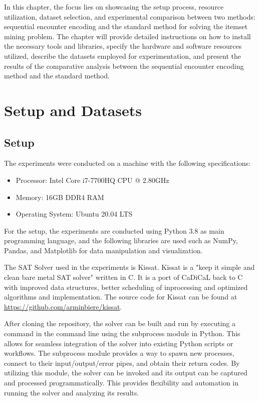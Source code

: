 In this chapter, the focus lies on showcasing the setup process, resource utilization, dataset selection,
and experimental comparison between two methods: sequential encounter encoding and the standard method for solving the itemset mining problem.
The chapter will provide detailed instructions on how to install the necessary tools and libraries, specify the hardware and software resources utilized,
describe the datasets employed for experimentation, and present the results of the comparative analysis between the sequential encounter encoding method and the standard method.
\section{Setup and Datasets}
\subsection{Setup}

The experiments were conducted on a machine with the following specifications:
\begin{itemize}
    \item Processor: Intel Core i7-7700HQ CPU @ 2.80GHz
    \item Memory: 16GB DDR4 RAM
    \item Operating System: Ubuntu 20.04 LTS
\end{itemize}
For the setup, the experiments are conducted using Python 3.8 as main programming language,
and the following libraries are used such as NumPy, Pandas, and Matplotlib for data manipulation and visualization.

The SAT Solver used in the experiments is Kissat.
Kissat is a "keep it simple and clean bare metal SAT solver"
written in C. It is a port of CaDiCaL back to C with improved data structures,
better scheduling of inprocessing and optimized algorithms and implementation.
The source code for Kissat can be found at \url{https://github.com/arminbiere/kissat}.

After cloning the repository, the solver can be built and run by executing a command in the command line using the subprocess module in Python.
This allows for seamless integration of the solver into existing Python scripts or workflows.
The subprocess module provides a way to spawn new processes, connect to their input/output/error pipes, and obtain their return codes.
By utilizing this module, the solver can be invoked and its output can be captured and processed programmatically.
This provides flexibility and automation in running the solver and analyzing its results.

